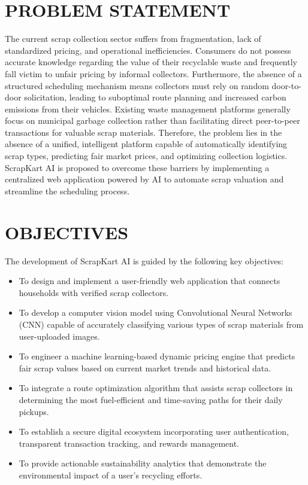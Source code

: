 \section{PROBLEM STATEMENT}
The current scrap collection sector suffers from fragmentation, lack of standardized pricing, and operational inefficiencies. Consumers do not possess accurate knowledge regarding the value of their recyclable waste and frequently fall victim to unfair pricing by informal collectors. Furthermore, the absence of a structured scheduling mechanism means collectors must rely on random door-to-door solicitation, leading to suboptimal route planning and increased carbon emissions from their vehicles. Existing waste management platforms generally focus on municipal garbage collection rather than facilitating direct peer-to-peer transactions for valuable scrap materials. Therefore, the problem lies in the absence of a unified, intelligent platform capable of automatically identifying scrap types, predicting fair market prices, and optimizing collection logistics. ScrapKart AI is proposed to overcome these barriers by implementing a centralized web application powered by AI to automate scrap valuation and streamline the scheduling process.

\section{OBJECTIVES}
The development of ScrapKart AI is guided by the following key objectives:
\begin{itemize}
    \item To design and implement a user-friendly web application that connects households with verified scrap collectors.
    \item To develop a computer vision model using Convolutional Neural Networks (CNN) capable of accurately classifying various types of scrap materials from user-uploaded images.
    \item To engineer a machine learning-based dynamic pricing engine that predicts fair scrap values based on current market trends and historical data.
    \item To integrate a route optimization algorithm that assists scrap collectors in determining the most fuel-efficient and time-saving paths for their daily pickups.
    \item To establish a secure digital ecosystem incorporating user authentication, transparent transaction tracking, and rewards management.
    \item To provide actionable sustainability analytics that demonstrate the environmental impact of a user's recycling efforts.
\end{itemize}

